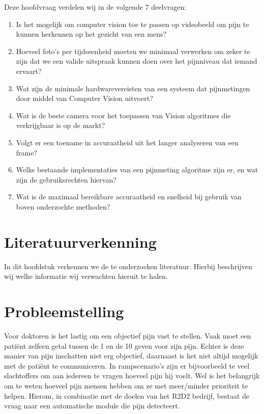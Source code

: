 \documentclass[11pt]{article}
\begin{document}
    Deze hoofdvraag verdelen wij in de volgende 7 deelvragen:

    \begin{enumerate}
        \item Is het mogelijk om computer vision toe te passen op videobeeld om pijn te kunnen herkennen op het gezicht van een mens?
        \item Hoeveel foto’s per tijdseenheid moeten we minimaal verwerken om zeker te zijn dat we een valide uitspraak kunnen doen over het pijnniveau dat iemand ervaart?
        \item Wat zijn de minimale hardwarevereisten van een systeem dat pijnmetingen door middel van Computer Vision uitvoert?
        \item Wat is de beste camera voor het toepassen van Vision algoritmes die verkrijgbaar is op de markt?
        \item Volgt er een toename in accuraatheid uit het langer analyseren van een frame?
        \item Welke bestaande implementaties van een pijnmeting algoritme zijn er, en wat zijn de gebruiksrechten hiervan?
        \item Wat is de maximaal bereikbare accuraatheid en snelheid bij gebruik van boven onderzochte methoden?
    \end{enumerate}


    \section{Literatuurverkenning}
    In dit hoofdstuk verkennen we de te onderzoeken literatuur. Hierbij beschrijven wij welke informatie wij verwachten hieruit te halen.


    \section{Probleemstelling}
    Voor doktoren is het lastig om een objectief pijn vast te stellen.
    Vaak moet een patiënt zelfeen getal tussen de 1 en de 10 geven voor zijn pijn.
    Echter is deze manier van pijn inschatten niet erg objectief, daarnaast is het niet
    altijd mogelijk met de patiënt te communiceren.
    In rampscenario’s zijn er bijvoorbeeld te veel slachtoffers om aan iedereen te vragen hoeveel pijn hij voelt.
    Wel is het belangrijk om te weten hoeveel pijn mensen hebben om ze met meer/minder prioriteit te helpen.
    Hierom, in combinatie met de doelen van het R2D2 bedrijf, bestaat de vraag naar een automatische module die pijn
    detecteert.
\end{document}
